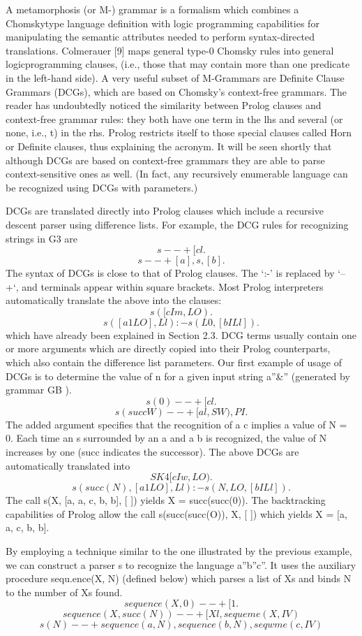 \label{cohen3}

A metamorphosis (or M-) grammar is a formalism which combines a Chomskytype
language definition with logic programming capabilities for manipulating
the semantic attributes needed to perform syntax-directed translations.
Colmerauer [9] maps general type-0 Chomsky rules into general logicprogramming
clauses, (i.e., those that may contain more than one predicate in
the left-hand side). A very useful subset of M-Grammars are Definite Clause
Grammars (DCGs), which are based on Chomsky’s context-free grammars. The
reader has undoubtedly noticed the similarity between Prolog clauses and context-free
grammar rules: they both have one term in the lhs and several (or none,
i.e., t) in the rhs. Prolog restricts itself to those special clauses called Horn or
Definite clauses, thus explaining the acronym. It will be seen shortly that
although DCGs are based on context-free grammars they are able to parse
context-sensitive ones as well. (In fact, any recursively enumerable language can
be recognized using DCGs with parameters.) 

DCGs are translated directly into Prolog clauses which include a recursive
descent parser using difference lists. For example, the DCG rules for recognizing
strings in G3 are
\[s --+ [cl.\]
\[s --+ [a], s, [b].\]
The syntax of DCGs is close to that of Prolog clauses. The ‘:-’ is replaced
by ‘--+‘, and terminals appear within square brackets. Most Prolog interpreters
automatically translate the above into the clauses:
\[s([c I m, LO).\]
\[s([a 1 LO], Ll) :- s(L0, [b I Ll]).\]
which have already been explained in Section 2.3. DCG terms usually contain
one or more arguments which are directly copied into their Prolog counterparts,
which also contain the difference list parameters. Our first example of usage of
DCGs is to determine the value of n for a given input string a”\&” (generated by
grammar GB ).
\[s(0) --+ [cl.\]
\[s(succW) --+ [al, SW), PI.\]
The added argument specifies that the recognition of a c implies a value of
N = 0. Each time an s surrounded by an a and a b is recognized, the value of N
increases by one (succ indicates the successor). The above DCGs are automatically
translated into
\[SK4 [c I w, LO).\]
\[s(succ(N), [a 1 LO], Ll) :- s(N, LO, [b I Ll]).\]
The call s(X, [a, a, c, b, b], [ ]) yields X = succ(succ(0)). The backtracking
capabilities of Prolog allow the call s(succ(succ(O)), X, [ ]) which yields X =
[a, a, c, b, b]. 

By employing a technique similar to the one illustrated by the previous
example, we can construct a parser s to recognize the language a”b”c”. It uses
the auxiliary procedure sequ.ence(X, N) (defined below) which parses a list of Xs
and binds N to the number of Xs found.
\[sequence(X, 0) --+ [ 1.\]
\[sequence(X, succ(N)) --+ [Xl, sequeme(X, IV)\]
\[s(N) --+ sequence(a, N), sequence(b, N), seqwme(c, IV)\]

